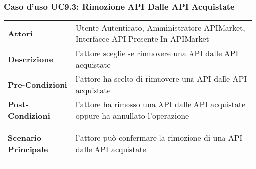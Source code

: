 \subsubsection{Caso d'uso UC9.3: Rimozione API Dalle API Acquistate}
\label{UC9.3}

\renewcommand*{\arraystretch}{1.6}
\begin{longtable}{ l | p{11cm}}
	\hline
	\rowcolor{Gray}
	\multicolumn{2}{c}{UC9.3: Rimozione API Dalle API Acquistate} \\
	\hline
	\textbf{Attori} &Utente Autenticato, Amministratore APIMarket, Interfacce API Presente In APIMarket \\
	\textbf{Descrizione} & l'attore sceglie se rimuovere una API dalle API acquistate \\
	\textbf{Pre-Condizioni} & l'attore ha scelto di rimuovere una API dalle API acquistate\\
	\textbf{Post-Condizioni}& l'attore ha rimosso una API dalle API acquistate oppure ha annullato l'operazione\\
	\textbf{Scenario Principale} & \begin{enumerate*}[label=(\arabic*.),itemjoin={\newline}]
			\item l'attore può confermare la rimozione di una API dalle API acquistate
	\end{enumerate*}\\
\end{longtable}


